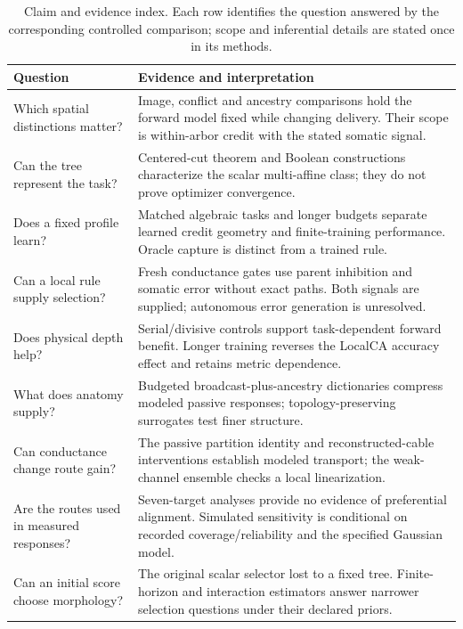 \begin{table}[tbp]
\centering
\caption{Claim and evidence index. Each row identifies the question answered by the corresponding controlled comparison; scope and inferential details are stated once in its methods.}
\label{tab:claim_boundaries}
\small
\begin{tabularx}{\textwidth}{p{}X}
\toprule
Question & Evidence and interpretation \\
\midrule
Which spatial distinctions matter? & Image, conflict and ancestry comparisons hold the forward model fixed while changing delivery. Their scope is within-arbor credit with the stated somatic signal. \\
Can the tree represent the task? & Centered-cut theorem and Boolean constructions characterize the scalar multi-affine class; they do not prove optimizer convergence. \\
Does a fixed profile learn? & Matched algebraic tasks and longer budgets separate learned credit geometry and finite-training performance. Oracle capture is distinct from a trained rule. \\
Can a local rule supply selection? & Fresh conductance gates use parent inhibition and somatic error without exact paths. Both signals are supplied; autonomous error generation is unresolved. \\
Does physical depth help? & Serial/divisive controls support task-dependent forward benefit. Longer training reverses the LocalCA accuracy effect and retains metric dependence. \\
What does anatomy supply? & Budgeted broadcast-plus-ancestry dictionaries compress modeled passive responses; topology-preserving surrogates test finer structure. \\
Can conductance change route gain? & The passive partition identity and reconstructed-cable interventions establish modeled transport; the weak-channel ensemble checks a local linearization. \\
Are the routes used in measured responses? & Seven-target analyses provide no evidence of preferential alignment. Simulated sensitivity is conditional on recorded coverage/reliability and the specified Gaussian model. \\
Can an initial score choose morphology? & The original scalar selector lost to a fixed tree. Finite-horizon and interaction estimators answer narrower selection questions under their declared priors. \\
\bottomrule
\end{tabularx}
\end{table}

